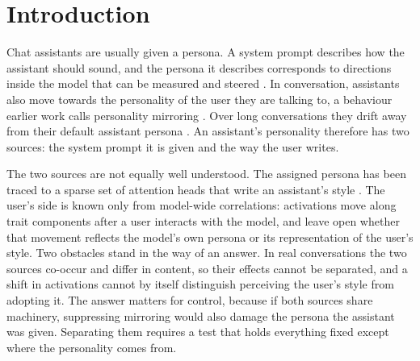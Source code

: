 \section{Introduction}
\label{sec:intro}

Chat assistants are usually given a persona. A system prompt describes how the assistant should sound, and the persona it describes corresponds to directions inside the model that can be measured and steered \citep{chen2025persona}. In conversation, assistants also move towards the personality of the user they are talking to, a behaviour earlier work calls personality mirroring \citep{sprejer2026white}. Over long conversations they drift away from their default assistant persona \citep{lu2026assistant}. An assistant's personality therefore has two sources: the system prompt it is given and the way the user writes.

The two sources are not equally well understood. The assigned persona has been traced to a sparse set of attention heads that write an assistant's style \citep{izawa2026steering}. The user's side is known only from model-wide correlations: activations move along trait components after a user interacts with the model, and \citet{sprejer2026white} leave open whether that movement reflects the model's own persona or its representation of the user's style. Two obstacles stand in the way of an answer. In real conversations the two sources co-occur and differ in content, so their effects cannot be separated, and a shift in activations cannot by itself distinguish perceiving the user's style from adopting it. The answer matters for control, because if both sources share machinery, suppressing mirroring would also damage the persona the assistant was given. Separating them requires a test that holds everything fixed except where the personality comes from.

